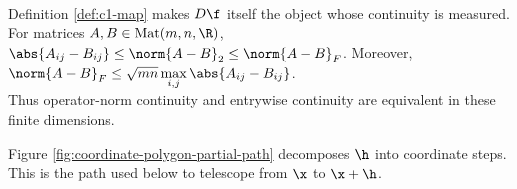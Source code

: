 \begin{perspective} \label{per:c1-operator-norm-continuity}
\\
Definition \ref{def:c1-map} makes $D\f$ itself the object whose continuity is measured.\\
For matrices $A,B\in\operatorname{Mat}(m,n,\R)$, $\abs{A_{ij}-B_{ij}}\leq\norm{A-B}_2\leq\norm{A-B}_F$. Moreover, $\norm{A-B}_F\leq\sqrt{mn}\max\limits_{i,j}\abs{A_{ij}-B_{ij}}$.\\
Thus operator-norm continuity and entrywise continuity are equivalent in these finite dimensions.
\end{perspective}

\noindent Figure \ref{fig:coordinate-polygon-partial-path} decomposes $\h$ into coordinate steps. This is the path used below to telescope from $\x$ to $\x+\h$.
\begin{illustrationfigure}[H]
  \centering
  
  \caption{The solid coordinate steps sum to the dashed direct increment $\h$ from $\x$ to $\x+\h$.}
  \label{fig:coordinate-polygon-partial-path}
\end{illustrationfigure}

